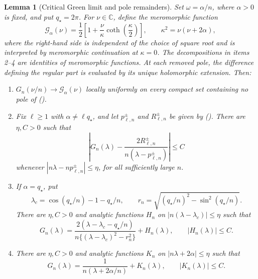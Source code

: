 \documentclass[twoside,10pt]{article}
\numberwithin{equation}{section}
\theoremstyle{slbody}
\newtheorem{lemma}[theorem]{Lemma}
\theoremstyle{definition}
\theoremstyle{remark}
\newcommand{\C}{\mathbb C}
\renewcommand{\eqref}[1]{%
  \textup{{\normalfont(\oldstylenums{\ref{#1}}}\normalfont)}}
\begin{document}
\begin{lemma}[Critical Green limit and pole remainders]
\label{lem:critical-green-local}
Set $\omega=\alpha/n$, where $\alpha>0$ is fixed, and put $q_\star=2\pi$.
For $\nu\in\C$, define the meromorphic function
\begin{equation}\label{eq:critical-green-limit}
 \mathcal G_\alpha(\nu)
 =\frac12\left[1+\frac{\nu}{\kappa}
                   \coth\!\left(\frac\kappa2\right)\right],
 \qquad \kappa^2=\nu(\nu+2\alpha),
\end{equation}
where the right-hand side is independent of the choice of square root
and is interpreted by meromorphic continuation at $\kappa=0$.
The decompositions in items 2--4 are identities of meromorphic
functions.  At each removed pole, the difference defining the regular
part is evaluated by its unique holomorphic extension.  Then:
\begin{enumerate}
\item $G_n(\nu/n)\to\mathcal G_\alpha(\nu)$ locally uniformly on every
  compact set containing no pole of \eqref{eq:critical-green-limit}.
\item Fix $\ell\ge1$ with $\alpha\ne\ell q_\star$, and let
  $p_{\ell,n}^\pm$ and $R_{\ell,n}^\pm$ be given by
  \eqref{eq:critical-pole-fraction}.  There are $\eta,C>0$ such
  that
  \begin{equation}\label{eq:critical-simple-regular-bound}
   \left|G_n(\lambda)-
       \frac{2R_{\ell,n}^\pm}
            {n(\lambda-p_{\ell,n}^\pm)}\right|\le C
  \end{equation}
  whenever $|n\lambda-np_{\ell,n}^\pm|\le\eta$, for all sufficiently
  large $n$.
\item If $\alpha=q_\star$, put
  \[
   \lambda_c=\cos(q_\star/n)-1-q_\star/n,
   \qquad r_n=\sqrt{(q_\star/n)^2-\sin^2(q_\star/n)}.
  \]
  There are $\eta,C>0$ and analytic functions $H_n$ on
  $|n(\lambda-\lambda_c)|\le\eta$ such that
  \begin{equation}\label{eq:critical-grouped-green}
   G_n(\lambda)=
   \frac{2(\lambda-\lambda_c-q_\star/n)}
        {n\{(\lambda-\lambda_c)^2-r_n^2\}}+H_n(\lambda),
   \qquad |H_n(\lambda)|\le C.
  \end{equation}
\item There are $\eta,C>0$ and analytic functions $K_n$ on
  $|n\lambda+2\alpha|\le\eta$ such that
  \begin{equation}\label{eq:critical-endpoint-green}
   G_n(\lambda)=\frac{1}{n(\lambda+2\alpha/n)}+K_n(\lambda),
   \qquad |K_n(\lambda)|\le C.
  \end{equation}
\end{enumerate}
\end{lemma}
\end{document}
